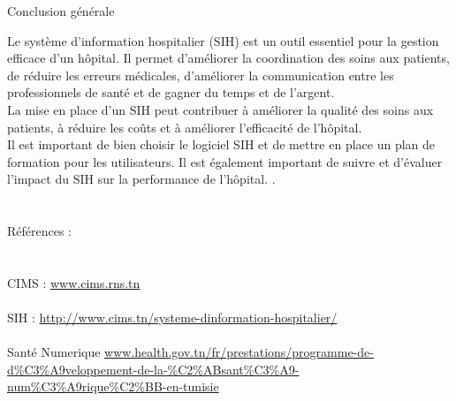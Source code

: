 \documentclass[12pt]{rapportINPTCLOUD}
\begin{document}
\begin{center}
	\Huge{Conclusion générale}
\end{center}
\large {
Le système d'information hospitalier (SIH) est un outil essentiel pour la gestion efficace d'un hôpital. Il permet d'améliorer la coordination des soins aux patients, de réduire les erreurs médicales, d'améliorer la communication entre les professionnels de santé et de gagner du temps et de l'argent.\\

La mise en place d'un SIH peut contribuer à améliorer la qualité des soins aux patients, à réduire les coûts et à améliorer l'efficacité de l'hôpital.\\

 Il est important de bien choisir le logiciel SIH et de mettre en place un plan de formation pour les utilisateurs. Il est également important de suivre et d'évaluer l'impact du SIH sur la performance de l'hôpital.}
\newpage
.\\ \\ \\
\huge{ Références :\\ \\ \\}
\normalsize{
CIMS : \url{www.cims.rns.tn}\\ \\
SIH : \url{http://www.cims.tn/systeme-dinformation-hospitalier/}\\ \\
Santé Numerique \url{www.health.gov.tn/fr/prestations/programme-de-d%C3%A9veloppement-de-la-%C2%ABsant%C3%A9-num%C3%A9rique%C2%BB-en-tunisie}\\
}
\end{document}
